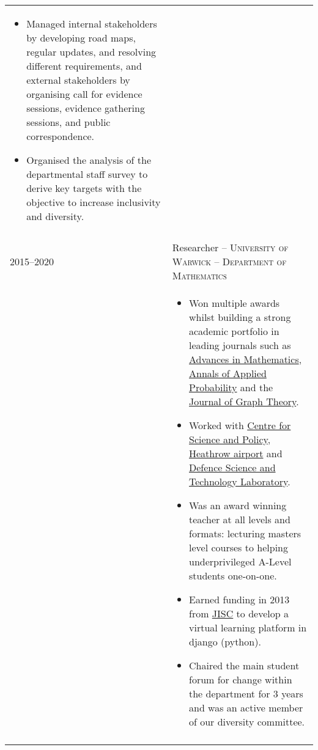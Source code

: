 \documentclass[a4paper,10pt]{article}
\begin{document}
\begin{tabular}{p{2.25cm}|p{15cm}}
\begin{itemize}
 	 	\item Managed internal stakeholders by developing road maps, regular updates, and resolving different requirements, and external stakeholders by organising call for evidence sessions, evidence gathering sessions, and public correspondence.
 	 	\item Organised the analysis of the departmental staff survey to derive key targets with the objective to increase inclusivity and diversity.
	\end{itemize}\vspace{-0.15 in}\\
\multicolumn{2}{c}{} \\
%
%
	\textsc{2015--2020} & \large{Researcher -- \textsc{University of Warwick} -- \textsc{Department of Mathematics}}\\
	 & \vspace{-0.07 in}\begin{itemize}
	\item Won multiple awards whilst building a strong academic portfolio in leading journals such as \href{https://www.sciencedirect.com/science/article/pii/S0001870818303347}{Advances in Mathematics}, \href{https://projecteuclid.org/journals/annals-of-applied-probability/volume-32/issue-1/From-the-Bernoulli-factory-to-a-dice-enterprise-via-perfect/10.1214/21-AAP1679.short}{Annals of Applied Probability} and the \href{http://onlinelibrary.wiley.com/doi/10.1002/jgt.22002/abstract}{Journal of Graph Theory}.
	\item Worked with \href{https://www.csap.cam.ac.uk/}{Centre for Science and Policy}, \href{https://www.heathrow.com/}{Heathrow airport} and \href{https://www.gov.uk/government/organisations/defence-science-and-technology-laboratory}{Defence Science and Technology Laboratory}.
	\item Was an award winning teacher at all levels and formats: lecturing masters level courses to helping underprivileged A-Level students one-on-one.
	\item Earned funding in 2013 from \href{https://www.jisc.ac.uk/}{JISC} to develop a virtual learning platform in django (python).
	\item Chaired the main student forum for change within the department for 3 years and was an active member of our diversity committee.
\end{itemize}\vspace{-0.15 in}\\
\multicolumn{2}{c}{} \\
\end{tabular}
\vspace{-0.5cm}
\end{document}
